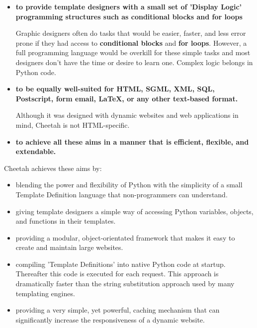 \begin{itemize}
     
\item {\bf to provide template designers with a small set of 'Display Logic'
       programming structures such as conditional blocks and 
       for loops}
     
     Graphic designers often do tasks that would be easier, faster, and less
     error prone if they had access to {\bf conditional blocks} and {\bf for
       loops}.  However, a full programming language would be overkill for these
     simple tasks and most designers don't have the time or desire to learn
     one. Complex logic belongs in Python code.
     
\item {\bf to be equally well-suited for HTML, SGML, XML, SQL, Postscript, form
       email, LaTeX, or any other text-based format.}
     
     Although it was designed with dynamic websites and web applications in mind,
     Cheetah is not HTML-specific.
     
\item {\bf to achieve all these aims in a manner that is efficient, flexible, and
       extendable.}
     
\end{itemize}

Cheetah achieves these aims by:

\begin{itemize}     
     
\item blending the power and flexibility of Python with the simplicity of a
     small Template Definition language that non-programmers can understand.
     
\item giving template designers a simple way of accessing Python variables,
     objects, and functions in their templates.
     
\item providing a modular, object-orientated framework that makes it easy to
     create and maintain large websites.
     
\item compiling 'Template Definitions' into native Python code at startup.
     Thereafter this code is executed for each request.  This approach is
     dramatically faster than the string substitution approach used by many
     templating engines.

\item providing a very simple, yet powerful, caching mechanism that can
     significantly increase the responsiveness of a dynamic website.

\end{itemize}



